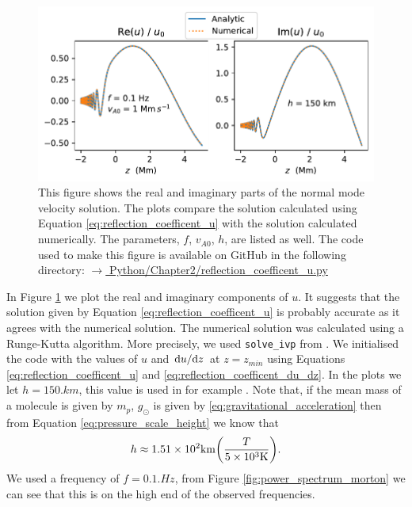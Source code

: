 \begin{figure}
    \centering
    \vspace{-20pt}
    \includegraphics[width=\textwidth]{figures/chapter02/reflection_coefficent_u.pdf}
    \vspace{-20pt}
    \caption{This figure shows the real and imaginary parts of the normal mode velocity solution. The plots compare the solution calculated using Equation \eqref{eq:reflection_coefficent_u} with the solution calculated numerically. The parameters, $f$, $v_{A0}$, $h$, are listed as well. The code used to make this figure is available on GitHub in the following directory:\newline
    \href{https://github.com/aleksyprok/apkp_thesis/blob/main/Python/Chapter2/reflection_coefficent_u.py}{$\rightarrow$ Python/Chapter2/reflection\_coefficent\_u.py}}
    \vspace{-10pt}
    \label{fig:reflection_coefficent_u}
\end{figure}

In Figure \ref{fig:reflection_coefficent_u} we plot the real and imaginary components of $u$. It suggests that the solution given by Equation \eqref{eq:reflection_coefficent_u} is probably accurate as it agrees with the numerical solution. The numerical solution was calculated using a Runge-Kutta algorithm. More precisely, we used \texttt{solve\_ivp} from \citet{SciPy2020}. We initialised the code with the values of $u$ and $\dv*{u}{z}$ at $z=z_{min}$ using Equations \eqref{eq:reflection_coefficent_u} and \eqref{eq:reflection_coefficent_du_dz}. In the plots we let $h=150\si{.km}$, this value is used in for example \citet{Hollweg1984b}. Note that, if the mean mass of a molecule is given by $m_p$, $g_\odot$ is given by \eqref{eq:gravitational_acceleration} then from Equation \eqref{eq:pressure_scale_height} we know that
\[h \approx 1.51\times10^2\si{.km}\qty(\frac{T}{5\times10^3\si{.K}}).\]
We used a frequency of $f=0.1\si{.Hz}$, from Figure \ref{fig:power_spectrum_morton} we can see that this is on the high end of the observed frequencies.

